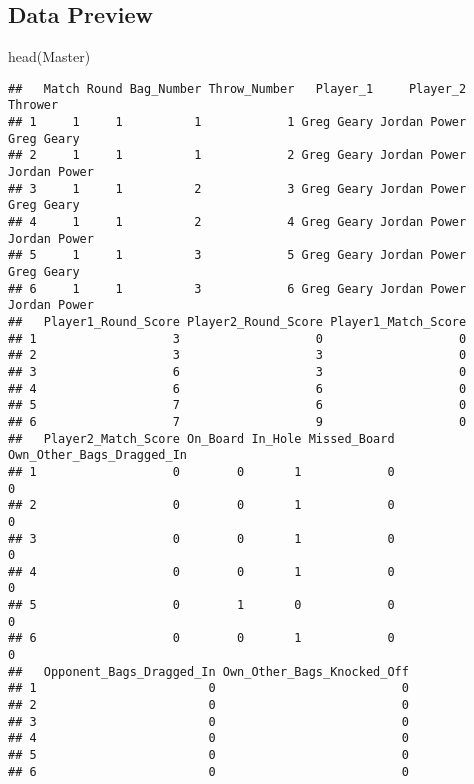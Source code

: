 \documentclass[
]{article}
\newenvironment{Shaded}{\begin{snugshade}}{\end{snugshade}}
\newcommand{\FunctionTok}[1]{\textcolor[rgb]{0.00,0.00,0.00}{#1}}
\newcommand{\NormalTok}[1]{#1}
\begin{document}
\hypertarget{data-preview}{%
\subsection{Data Preview}\label{data-preview}}

\begin{Shaded}
\begin{Highlighting}[]
\FunctionTok{head}\NormalTok{(Master)}
\end{Highlighting}
\end{Shaded}

\begin{verbatim}
##   Match Round Bag_Number Throw_Number   Player_1     Player_2      Thrower
## 1     1     1          1            1 Greg Geary Jordan Power   Greg Geary
## 2     1     1          1            2 Greg Geary Jordan Power Jordan Power
## 3     1     1          2            3 Greg Geary Jordan Power   Greg Geary
## 4     1     1          2            4 Greg Geary Jordan Power Jordan Power
## 5     1     1          3            5 Greg Geary Jordan Power   Greg Geary
## 6     1     1          3            6 Greg Geary Jordan Power Jordan Power
##   Player1_Round_Score Player2_Round_Score Player1_Match_Score
## 1                   3                   0                   0
## 2                   3                   3                   0
## 3                   6                   3                   0
## 4                   6                   6                   0
## 5                   7                   6                   0
## 6                   7                   9                   0
##   Player2_Match_Score On_Board In_Hole Missed_Board Own_Other_Bags_Dragged_In
## 1                   0        0       1            0                         0
## 2                   0        0       1            0                         0
## 3                   0        0       1            0                         0
## 4                   0        0       1            0                         0
## 5                   0        1       0            0                         0
## 6                   0        0       1            0                         0
##   Opponent_Bags_Dragged_In Own_Other_Bags_Knocked_Off
## 1                        0                          0
## 2                        0                          0
## 3                        0                          0
## 4                        0                          0
## 5                        0                          0
## 6                        0                          0

\end{verbatim}
\end{document}
